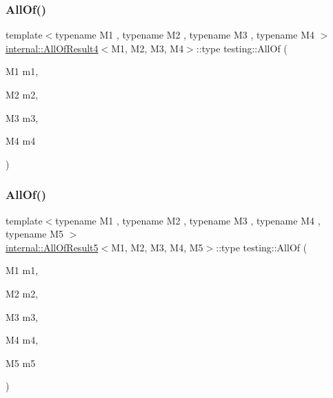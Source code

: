\mbox{\label{namespacetesting_a4a9a119cde16e43b364f3573136857a1}} 
\subsubsection{\texorpdfstring{AllOf()}{AllOf()}\hspace{0.1cm}{\footnotesize\ttfamily [3/9]}}
{\footnotesize\ttfamily template$<$typename M1 , typename M2 , typename M3 , typename M4 $>$ \\
\mbox{\hyperlink{structtesting_1_1internal_1_1_all_of_result4}{internal\+::\+All\+Of\+Result4}}$<$M1, M2, M3, M4$>$\+::type testing\+::\+All\+Of (\begin{DoxyParamCaption}\item[{M1}]{m1,  }\item[{M2}]{m2,  }\item[{M3}]{m3,  }\item[{M4}]{m4 }\end{DoxyParamCaption})\hspace{0.3cm}{\ttfamily [inline]}}

\mbox{\label{namespacetesting_ab8f5e6cf1c22acf51a2b9b376b0ef03a}} 
\subsubsection{\texorpdfstring{AllOf()}{AllOf()}\hspace{0.1cm}{\footnotesize\ttfamily [4/9]}}
{\footnotesize\ttfamily template$<$typename M1 , typename M2 , typename M3 , typename M4 , typename M5 $>$ \\
\mbox{\hyperlink{structtesting_1_1internal_1_1_all_of_result5}{internal\+::\+All\+Of\+Result5}}$<$M1, M2, M3, M4, M5$>$\+::type testing\+::\+All\+Of (\begin{DoxyParamCaption}\item[{M1}]{m1,  }\item[{M2}]{m2,  }\item[{M3}]{m3,  }\item[{M4}]{m4,  }\item[{M5}]{m5 }\end{DoxyParamCaption})\hspace{0.3cm}{\ttfamily [inline]}}

\mbox{\label{namespacetesting_afc8e2d405f80e7d3df32842ddb648125}} 
